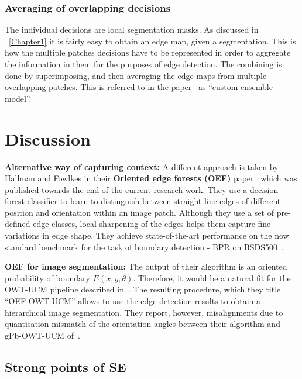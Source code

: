 \subsubsection*{Averaging of overlapping decisions}
The individual decisions are local segmentation masks. As discussed in \textsection~\ref{Chapter1} it is fairly easy to obtain an edge map, given a segmentation. This is how the multiple patches decisions have to be represented in order to aggregate the information in them for the purposes of edge detection. The combining is done by superimposing, %
and then averaging the edge maps from multiple overlapping patches. %
This is referred to in the paper~\cite{DollarICCV13edges} as ``custom ensemble model''.

\section{Discussion}
\textbf{Alternative way of capturing context:} A different approach is taken by Hallman and Fowlkes in their \textbf{Oriented edge forests (OEF)} paper~\cite{Hallman2014} which was published towards the end of the current research work. They use a decision forest classifier to learn to distinguish between straight-line edges of different position and orientation within an image patch. Although they use a set of pre-defined edge classes, local sharpening of the edges helps them capture fine variations in edge shape. They achieve state-of-the-art performance on the now standard benchmark for the task of boundary detection - BPR on BSDS500~\cite{Arbelaez11}.

\textbf{OEF for image segmentation:} The output of their algorithm is an oriented probability of boundary $E(x,y,\theta)$. Therefore, it would be a natural fit for the OWT-UCM pipeline described in~\cite{Arbelaez11}. The resulting procedure, which they title ``OEF-OWT-UCM'' allows to use the edge detection results to obtain a hierarchical image segmentation. They report, however, misalignments due to quantisation mismatch of the orientation angles between their algorithm and gPb-OWT-UCM of~\cite{Arbelaez11}.

\subsection*{Strong points of SE}

